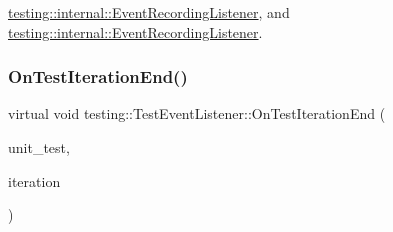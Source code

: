 \mbox{\hyperlink{classtesting_1_1internal_1_1_event_recording_listener_a48f6f53c044e8cb6425f9bc7319ddecc}{testing\+::internal\+::\+Event\+Recording\+Listener}}, and \mbox{\hyperlink{classtesting_1_1internal_1_1_event_recording_listener_ab0cc007bcfaf06cd383d574c88f62aea}{testing\+::internal\+::\+Event\+Recording\+Listener}}.

\mbox{\label{classtesting_1_1_test_event_listener_a550fdb3e55726e4cefa09f5697941425}} 
\subsubsection{\texorpdfstring{OnTestIterationEnd()}{OnTestIterationEnd()}\hspace{0.1cm}{\footnotesize\ttfamily [3/3]}}
{\footnotesize\ttfamily virtual void testing\+::\+Test\+Event\+Listener\+::\+On\+Test\+Iteration\+End (\begin{DoxyParamCaption}\item[{const \mbox{\hyperlink{classtesting_1_1_unit_test}{Unit\+Test}} \&}]{unit\+\_\+test,  }\item[{int}]{iteration }\end{DoxyParamCaption})\hspace{0.3cm}{\ttfamily [pure virtual]}}



